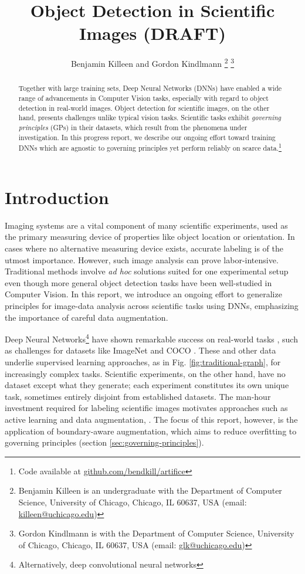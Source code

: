 \documentclass[10pt, journal]{IEEEtran}
\title{Object Detection in Scientific Images (DRAFT)}
\author{Benjamin Killeen and Gordon Kindlmann %
  \thanks{Benjamin Killeen is an undergraduate with the Department of Computer
    Science, University of Chicago, Chicago, IL 60637, USA (email:
    \href{mailto:killeen@uchicago.edu}{killeen@uchicago.edu})} %
  \thanks{Gordon Kindlmann is with the Department of Computer Science, 
    University of Chicago, Chicago, IL 60637, USA (email:
    \href{mailto:glk@uchicago.edu}{glk@uchicago.edu})} %
}
\begin{document}
\maketitle

\begin{abstract}
  Together with large training sets, Deep Neural Networks (DNNs) have enabled a
  wide range of advancements in Computer Vision tasks, especially with regard to
  object detection in real-world images. Object detection for scientific images,
  on the other hand, presents challenges unlike typical vision tasks. Scientific
  tasks exhibit \emph{governing principles} (GPs) in their datasets, which
  result from the phenomena under investigation. In this progress report, we
  describe our ongoing effort toward training DNNs which are agnostic to
  governing principles yet perform reliably on scarce data.\footnote{Code
    available at \href{https://github.com/bendkill/artifice}
    {github.com/bendkill/artifice}}
\end{abstract}

\section{Introduction}
\label{sec:introduction}


Imaging systems are a vital component of many scientific experiments, used as
the primary measuring device of properties like object location or
orientation. In cases where no alternative measuring device exists, accurate
labeling is of the utmost importance. However, such image analysis can prove
labor-intensive. Traditional methods involve \emph{ad hoc} solutions suited for
one experimental setup even though more general object detection tasks have been
well-studied in Computer Vision. In this report, we introduce an ongoing effort
to generalize principles for image-data analysis across scientific tasks using
DNNs, emphasizing the importance of careful data augmentation.

Deep Neural Networks\footnote{Alternatively, deep convolutional neural networks}
have shown remarkable success on real-world tasks
\cite{krizhevsky_imagenet_2012}, such as challenges for datasets like ImageNet
\cite{deng_imagenet:_nodate} and COCO \cite{lin_microsoft_2014}. These and other
data underlie supervised learning approaches, as in
Fig. \ref{fig:traditional-graph}, for increasingly complex tasks. Scientific
experiments, on the other hand, have no dataset except what they generate; each
experiment constitutes its own unique task, sometimes entirely disjoint from
established datasets. The man-hour investment required for labeling scientific
images motivates approaches such as active learning \cite{settles_active_2012,
  kao_localization-aware_2018, jain_active_2016} and data augmentation,
\cite{krizhevsky_imagenet_2012, ronneberger_u-net:_2015}. The focus of this
report, however, is the application of boundary-aware augmentation, which aims
to reduce overfitting to governing principles (section
\ref{sec:governing-principles}).
\end{document}

